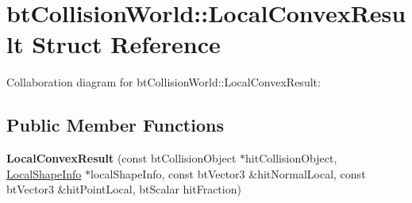 \hypertarget{structbt_collision_world_1_1_local_convex_result}{\section{bt\+Collision\+World\+:\+:Local\+Convex\+Result Struct Reference}
\label{structbt_collision_world_1_1_local_convex_result}
}


Collaboration diagram for bt\+Collision\+World\+:\+:Local\+Convex\+Result\+:
\subsection*{Public Member Functions}
\begin{DoxyCompactItemize}
\item 
\hypertarget{structbt_collision_world_1_1_local_convex_result_a954dda3e8da8989aa61d5c49c9809b84}{{\bfseries Local\+Convex\+Result} (const bt\+Collision\+Object $\ast$hit\+Collision\+Object, \hyperlink{structbt_collision_world_1_1_local_shape_info}{Local\+Shape\+Info} $\ast$local\+Shape\+Info, const bt\+Vector3 \&hit\+Normal\+Local, const bt\+Vector3 \&hit\+Point\+Local, bt\+Scalar hit\+Fraction)}\label{structbt_collision_world_1_1_local_convex_result_a954dda3e8da8989aa61d5c49c9809b84}

\end{DoxyCompactItemize}
